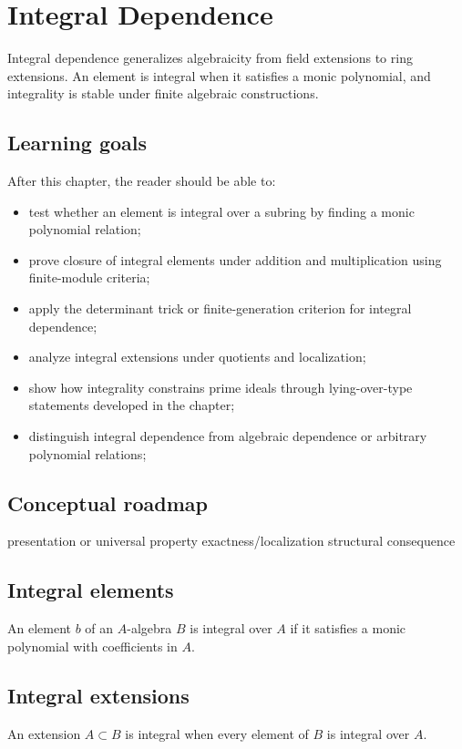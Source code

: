 \chapter{Integral Dependence}
\label{ch:v19}

Integral dependence generalizes algebraicity from field extensions to ring extensions. An element is integral when it satisfies a monic polynomial, and integrality is stable under finite algebraic constructions.

\section*{Learning goals}
After this chapter, the reader should be able to:
\begin{itemize}
\item test whether an element is integral over a subring by finding a monic polynomial relation;
\item prove closure of integral elements under addition and multiplication using finite-module criteria;
\item apply the determinant trick or finite-generation criterion for integral dependence;
\item analyze integral extensions under quotients and localization;
\item show how integrality constrains prime ideals through lying-over-type statements developed in the chapter;
\item distinguish integral dependence from algebraic dependence or arbitrary polynomial relations;
\end{itemize}
\section*{Conceptual roadmap}
\volroadmap
  {presentation or universal property}
  {exactness/localization}
  {structural consequence}

\section{Integral elements}
An element $b$ of an $A$-algebra $B$ is integral over $A$ if it satisfies a monic polynomial with coefficients in $A$.

\section{Integral extensions}
An extension $A\subset B$ is integral when every element of $B$ is integral over $A$.

